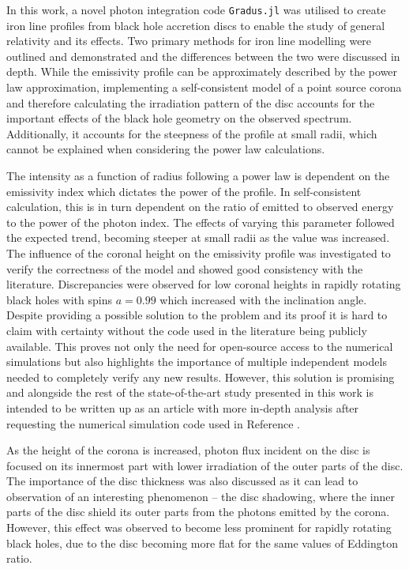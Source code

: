 \documentclass[fleqn,usenatbib,useAMS]{mnras}
\begin{document}
In this work, a novel photon integration code {\tt Gradus.jl} was utilised to create iron line profiles from black hole accretion discs to enable the study of general relativity and its effects. Two primary methods for iron line modelling were outlined and demonstrated and the differences between the two were discussed in depth. While the emissivity profile can be approximately described by the power law approximation, implementing a self-consistent model of a point source corona and therefore calculating the irradiation pattern of the disc accounts for the important effects of the black hole geometry on the observed spectrum. Additionally, it accounts for the steepness of the profile at small radii, which cannot be explained when considering the power law calculations. 

The intensity as a function of radius following a power law is dependent on the emissivity index which dictates the power of the profile. In self-consistent calculation, this is in turn dependent on the ratio of emitted to observed energy to the power of the photon index. The effects of varying this parameter followed the expected trend, becoming steeper at small radii as the value was increased. The influence of the coronal height on the emissivity profile was investigated to verify the correctness of the model and showed good consistency with the literature. Discrepancies were observed for low coronal heights in rapidly rotating black holes with spins $a = 0.99$ which increased with the inclination angle. Despite providing a possible solution to the problem and its proof it is hard to claim with certainty without the code used in the literature being publicly available. This proves not only the need for open-source access to the numerical simulations but also highlights the importance of multiple independent models needed to completely verify any new results. However, this solution is promising and alongside the rest of the state-of-the-art study presented in this work is intended to be written up as an article with more in-depth analysis after requesting the numerical simulation code used in Reference \cite{taylor2018exploring}.

As the height of the corona is increased, photon flux incident on the disc is focused on its innermost part with lower irradiation of the outer parts of the disc. The importance of the disc thickness was also discussed as it can lead to observation of an interesting phenomenon -- the disc shadowing, where the inner parts of the disc shield its outer parts from the photons emitted by the corona. However, this effect was observed to become less prominent for rapidly rotating black holes, due to the disc becoming more flat for the same values of Eddington ratio.
\end{document}
